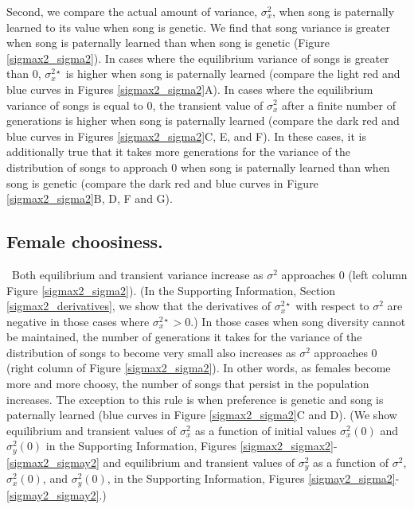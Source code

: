 \documentclass[12pt]{article}
\begin{document}

Second, we compare the actual amount of variance, $\sigma_x^2$, when song is paternally learned to its value when song is genetic. We find that song variance is greater when song is paternally learned than when song is genetic (Figure \ref{sigmax2_sigma2}). In cases where the equilibrium variance of songs is greater than $0$, $\sigma_x^{2\star}$ is higher when song is paternally learned (compare the light red and blue curves in Figures \ref{sigmax2_sigma2}A). In cases where the equilibrium variance of songs is equal to $0$, the transient value of $\sigma_x^2$ after a finite number of generations is higher when song is paternally learned (compare the dark red and blue curves in Figures \ref{sigmax2_sigma2}C, E, and F). In these cases, it is additionally true that it takes more generations for the variance of the distribution of songs to approach $0$ when song is paternally learned than when song is genetic (compare the dark red and blue curves in Figure \ref{sigmax2_sigma2}B, D, F and G). 
 

\subsection*{Female choosiness. }
\ Both equilibrium and transient variance increase as $\sigma^2$ approaches $0$ (left column Figure \ref{sigmax2_sigma2}). (In the Supporting Information, Section \ref{sigmax2_derivatives}, we show that the derivatives of $\sigma_x^{2\star}$ with respect to $\sigma^2$ are negative in those cases where $\sigma_x^{2\star}>0$.) In those cases when song diversity cannot be maintained, the number of generations it takes for the variance of the distribution of songs to become very small also increases as $\sigma^2$ approaches $0$ (right column of Figure \ref{sigmax2_sigma2}). In other words, as females become more and more choosy, the number of songs that persist in the population increases.  The exception to this rule is when preference is genetic and song is paternally learned (blue curves in Figure \ref{sigmax2_sigma2}C and D).  (We show equilibrium and transient values of $\sigma_x^{2}$  as a function of initial values $\sigma_x^2(0)$ and $\sigma_y^2(0)$ in the Supporting Information, Figures \ref{sigmax2_sigmax2}-\ref{sigmax2_sigmay2} and equilibrium and transient values of $\sigma_y^{2}$ as a function of $\sigma^2$, $\sigma_x^2(0)$, and $\sigma_y^2(0)$, in the Supporting Information, Figures \ref{sigmay2_sigma2}-\ref{sigmay2_sigmay2}.)
 
\end{document}
